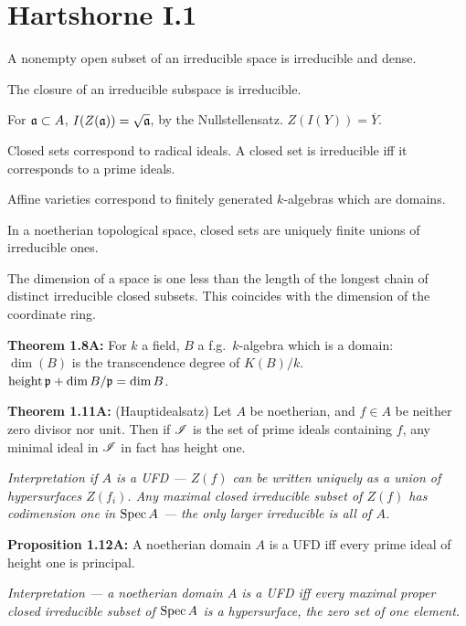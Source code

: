 \documentclass[11pt,makeidx]{article}
\newcommand{\INDENT}{\textbf{}\hspace{4mm}}
\begin{document}
\section*{Hartshorne I.1}
\begin{itemise}
\item A nonempty open subset of an irreducible space is
irreducible and dense.
\item The closure of an irreducible subspace is irreducible.
\item For $\mathfrak{a}\subset A$, $I(Z(\mathfrak{a}))=\sqrt{\mathfrak{a}}$, by the
Nullstellensatz. $Z(I(Y))=\overline Y$.
\item Closed sets correspond to radical ideals. A closed set is
irreducible iff it corresponds to a prime
ideals.
\item Affine varieties correspond to finitely generated
$k$-algebras which are domains.
\item In a noetherian topological space, closed sets are
uniquely finite unions of irreducible ones.
\item The dimension of a space is one less than the length of
the longest chain of distinct irreducible closed subsets. This coincides with
the dimension of the coordinate ring.
\item \textbf{Theorem 1.8A:} For $k$ a field, $B$ a f.g.\
$k$-algebra which is a domain:\\ \Bullet $\dim(B)$ is the transcendence degree
of $K(B)/k$. \ \ \Bullet $\text{height}\,\mathfrak{p}+\dim B/\mathfrak{p}=\dim B$.
\item \textbf{Theorem 1.11A:}\index{I.1.11A}
(Hauptidealsatz) Let $A$ be noetherian, and $f\in A$ be
neither zero divisor nor unit. Then if $\mathscr{I}$ is the set of prime ideals
containing $f$, any minimal ideal in $\mathscr{I}$ in fact has height one.

\INDENT\emph{Interpretation if $A$ is a UFD --- $Z(f)$ can be written uniquely
as a union of hypersurfaces $Z(f_i)$. Any maximal closed irreducible subset of
$Z(f)$ has codimension one in $\operatorname{Spec} A$ --- the only larger irreducible is all
of $A$.}
\item \textbf{Proposition 1.12A:} A noetherian domain $A$ is a
UFD iff every prime ideal of height one is principal.

\INDENT\emph{Interpretation --- a noetherian domain $A$ is a UFD iff every
maximal proper closed irreducible subset of $\operatorname{Spec} A$ is a hypersurface, the
zero set of one element.}
\end{itemise}
\printindex
\end{document}
